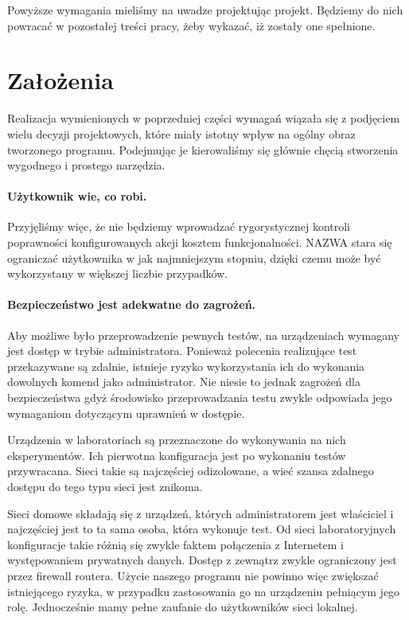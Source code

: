 \documentclass[00-praca-magisterska.tex]{subfiles}
\begin{document}
Powyższe wymagania mieliśmy na uwadze projektując projekt. Będziemy do nich
powracać w pozostałej treści pracy, żeby wykazać, iż zostały one spełnione.

\section{Założenia}

Realizacja wymienionych w poprzedniej części wymagań wiązała się z podjęciem
wielu decyzji projektowych, które miały istotny wpływ na ogólny obraz tworzonego
programu.  Podejmując je kierowaliśmy się głównie chęcią stworzenia wygodnego i
prostego narzędzia.

\paragraph{Użytkownik wie, co robi.} Przyjęliśmy więc, że nie będziemy
wprowadzać rygorystycznej kontroli poprawności konfigurowanych akcji kosztem
funkcjonalności. NAZWA stara się ograniczać użytkownika w jak najmniejszym stopniu,
dzięki czemu może być wykorzystany w większej liczbie przypadków.

\paragraph{Bezpieczeństwo jest adekwatne do zagrożeń.} Aby możliwe było
przeprowadzenie pewnych testów, na urządzeniach wymagany jest dostęp w trybie
administratora. Ponieważ polecenia realizujące test przekazywane są zdalnie,
istnieje ryzyko wykorzystania ich do wykonania dowolnych komend jako
administrator. Nie niesie to jednak zagrożeń dla bezpieczeństwa gdyż środowisko
przeprowadzania testu zwykle odpowiada jego wymaganiom dotyczącym uprawnień w
dostępie.

Urządzenia w laboratoriach są przeznaczone do wykonywania na nich
eksperymentów.  Ich pierwotna konfiguracja jest po wykonaniu testów
przywracana. Sieci takie są najczęściej odizolowane, a wieć szansa zdalnego
dostępu do tego typu sieci jest znikoma.

Sieci domowe składają się z urządzeń, których administratorem jest właściciel i
najczęściej jest to ta sama osoba, która wykonuje test. Od sieci laboratoryjnych
konfiguracje takie różnią się zwykle faktem połączenia z Internetem i
występowaniem prywatnych danych. Dostęp z zewnątrz zwykle ograniczony jest przez
firewall routera. Użycie naszego programu nie powinno więc zwiększać
istniejącego ryzyka, w przypadku zastosowania go na urządzeniu pełniącym jego
rolę. Jednocześnie mamy pełne zaufanie do użytkowników sieci lokalnej.
\end{document}
